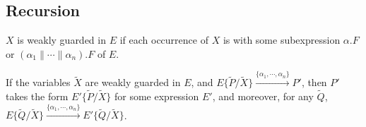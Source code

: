 \subsection{Recursion}

\begin{definition}
$X$ is weakly guarded in $E$ if each occurrence of $X$ is with some subexpression $\alpha.F$ or $(\alpha_1\parallel\cdots\parallel\alpha_n).F$ of $E$.
\end{definition}

\begin{lemma}\label{LUS}
If the variables $\widetilde{X}$ are weakly guarded in $E$, and $E\{\widetilde{P}/\widetilde{X}\}\xrightarrow{\{\alpha_1,\cdots,\alpha_n\}}P'$, then $P'$ takes the form $E'\{\widetilde{P}/\widetilde{X}\}$ for some expression $E'$, and moreover, for any $\widetilde{Q}$, $E\{\widetilde{Q}/\widetilde{X}\}\xrightarrow{\{\alpha_1,\cdots,\alpha_n\}}E'\{\widetilde{Q}/\widetilde{X}\}$.
\end{lemma}

